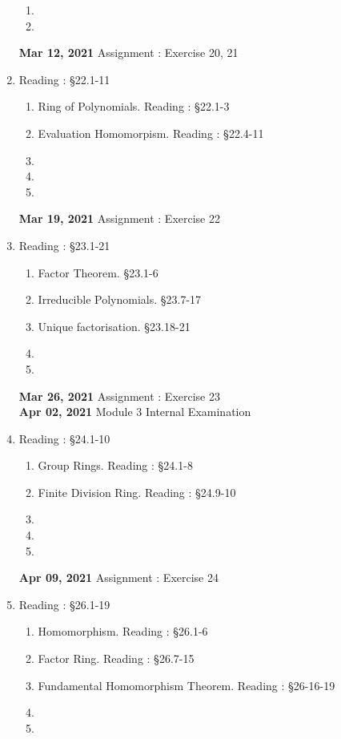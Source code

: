 \begin{enumerate}[label=Week \arabic*]
\begin{enumerate}[label=Day \arabic*]
			\item
			\item
		\end{enumerate}
		\textbf{Mar 12, 2021} Assignment : Exercise 20, 21
	\item Reading : \S22.1-11 
		\begin{enumerate}[label=Day \arabic*]
			\item Ring of Polynomials. Reading : \S22.1-3
			\item Evaluation Homomorpism. Reading : \S22.4-11
			\item
			\item
			\item
		\end{enumerate}
		\textbf{Mar 19, 2021} Assignment : Exercise 22
	\item Reading : \S23.1-21 
		\begin{enumerate}[label=Day \arabic*]
			\item Factor Theorem. \S23.1-6
			\item Irreducible Polynomials. \S23.7-17
			\item Unique factorisation. \S23.18-21
			\item
			\item
		\end{enumerate}
		\textbf{Mar 26, 2021} Assignment : Exercise 23\\
		\textbf{Apr 02, 2021} Module 3 Internal Examination
	\item Reading : \S24.1-10 
		\begin{enumerate}[label=Day \arabic*]
			\item Group Rings. Reading : \S24.1-8
			\item Finite Division Ring. Reading : \S24.9-10
			\item
			\item
			\item
		\end{enumerate}
		\textbf{Apr 09, 2021} Assignment : Exercise 24
	\item Reading : \S26.1-19 
		\begin{enumerate}[label=Day \arabic*]
			\item Homomorphism. Reading : \S26.1-6
			\item Factor Ring. Reading : \S26.7-15
			\item Fundamental Homomorphism Theorem. Reading : \S26-16-19
			\item
			\item
		\end{enumerate}

\end{enumerate}
